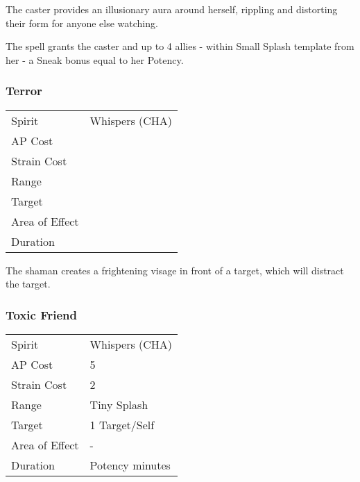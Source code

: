 \documentclass[11pt,a4paper,twocolumn]{book}
\begin{document}
The caster provides an illusionary aura around herself, rippling and distorting their form for anyone else watching.

The spell grants the caster and up to 4 allies - within Small Splash template from her - a Sneak bonus equal to her Potency.



\subsubsection*{Terror}
{
	\begin{tabu} to 75mm{| X[l,4] | X[l,7] |}
		\hline
		Spirit         & Whispers (CHA) \\
		AP Cost        &                \\
		Strain Cost    &                \\
		Range          &                \\
		Target         &                \\
		Area of Effect &                \\
		Duration       &                \\ \hline
	\end{tabu}
	
}

The shaman creates a frightening visage in front of a target, which will distract the target.

\subsubsection*{Toxic Friend}
{
	\begin{tabu} to 70mm{| X[l,4] | X[l,7] |}
		\hline
		Spirit         & Whispers (CHA)  \\
		AP Cost        & 5               \\
		Strain Cost    & 2               \\
		Range          & Tiny Splash     \\
		Target         & 1 Target/Self   \\
		Area of Effect & -               \\
		Duration       & Potency minutes \\ \hline
	\end{tabu}
	
}
\medskip
\end{document}
